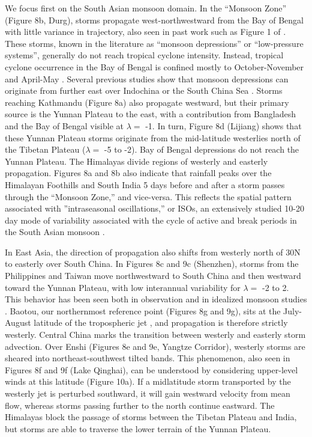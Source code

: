 	 We focus first on the South Asian monsoon domain. In the ``Monsoon Zone'' (Figure 8b, Durg), storms propagate west-northwestward from the Bay of Bengal with little variance in trajectory, also seen in past work such as Figure 1 of \cite{Sikka1977}. These storms, known in the literature as ``monsoon depressions'' or ``low-pressure systems''\citep{Sikka1977,Chen1999,Krishnamurthy2010}, generally do not reach tropical cyclone intensity. Instead, tropical cyclone occurrence in the Bay of Bengal is confined mostly to October-November and April-May \citep{Li2013}. Several previous studies show that monsoon depressions can originate from further east over Indochina or the South China Sea \citep{Saha1981}. Storms reaching Kathmandu (Figure 8a) also propagate westward, but their primary source is the Yunnan Plateau to the east, with a contribution from Bangladesh and the Bay of Bengal visible at $\lambda =$ -1. In turn, Figure 8d (Lijiang) shows that these Yunnan Plateau storms originate from the mid-latitude westerlies north of the Tibetan Plateau ($\lambda =$ -5 to -2). Bay of Bengal depressions do not reach the Yunnan Plateau. The Himalayas divide regions of westerly and easterly propagation. Figures 8a and 8b also indicate that rainfall peaks over the Himalayan Foothills and South India 5 days before and after a storm passes through the ``Monsoon Zone,'' and vice-versa. This reflects the spatial pattern associated with ''intraseasonal oscillations,'' or ISOs, an extensively studied 10-20 day mode of variability associated with the cycle of active and break periods in the South Asian monsoon \citep{Krishnamurti1980,Chen1993,Annamalai2001,Han2006,Fujinami2011,Fujinami2014}.
	 	 
	 In East Asia, the direction of propagation also shifts from westerly north of 30\textdegree N to easterly over South China. In Figures 8c and 9c (Shenzhen), storms from the Philippines and Taiwan move northwestward to South China and then westward toward the Yunnan Plateau, with low interannual variability for $\lambda =$ -2 to 2. This behavior has been seen both in observation \citep{Chen1999,Liu2003} and in idealized monsoon studies \citep{Prive2007a}. Baotou, our northernmost reference point (Figures 8g and 9g), sits at the July-August latitude of the tropospheric jet \citep{Schiemann2009}, and propagation is therefore strictly westerly. Central China marks the transition between westerly and easterly storm advection. Over Enshi (Figures 8e and 9e, Yangtze Corridor), westerly storms are sheared into northeast-southwest tilted bands. This phenomenon, also seen in Figures 8f and 9f (Lake Qinghai), can be understood by considering upper-level winds at this latitude (Figure 10a). If a midlatitude storm transported by the westerly jet is perturbed southward, it will gain westward velocity from mean flow, whereas storms passing further to the north continue eastward. The Himalayas block the passage of storms between the Tibetan Plateau and India, but storms are able to traverse the lower terrain of the Yunnan Plateau.
	 
